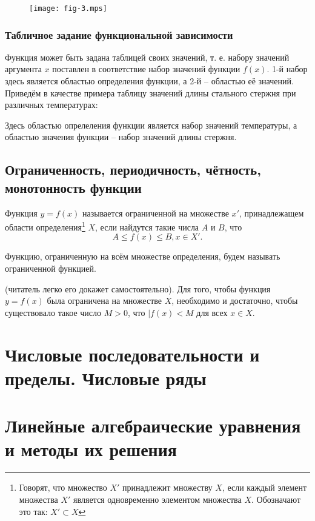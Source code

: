\begin{figure}
	\texttt{[image: fig-3.mps]}
	\caption{}
	\label{fig:3}
\end{figure}

\subsection{Табличное задание функциональной зависимости}
Функция может быть задана таблицей своих значений, т. е. набору значений
аргумента $x$ поставлен в соответствие набор значений функции $f(x)$. 1-й
набор здесь является областью определения функции, а 2-й -- областью её
значений. Приведём в качестве примера таблицу значений длины стального стержня
при различных температурах:


Здесь областью опрелеления функции является набор значений температуры, а
областью значения функции -- набор значений длины стержня.

\section{Ограниченность, периодичность, чётность, монотонность функции}
\begin{definition}
	Функция $y = f(x)$ называется ограниченной на множестве $x'$,
	принадлежащем области определения\footnote{Говорят, что множество $X'$
	принадлежит множеству $X$, если каждый элемент множества $X'$ является
	одновременно элементом множества $X$. Обозначают это так: $X' \subset
	X$} $X$, если найдутся такие числа $A$ и $B$, что
	$$A \leq f(x) \leq B, x \in X'.$$
\end{definition}

Функцию, ограниченную на всём множестве определения, будем называть
ограниченной функцией.

\begin{corollary}
	(читатель легко его докажет самостоятельно). Для того, чтобы функция $y
	= f(x)$ была ограничена на множестве $X$, необходимо и достаточно,
	чтобы существовало такое число $M > 0$, что $|f(x) < M$ для всех $x
	\in X$.
\end{corollary}

\chapter[Числовые ряды]{Числовые последовательности и пределы. Числовые ряды}
\chapter[Линейные уравнения]{Линейные алгебраические уравнения и методы их
	решения}
